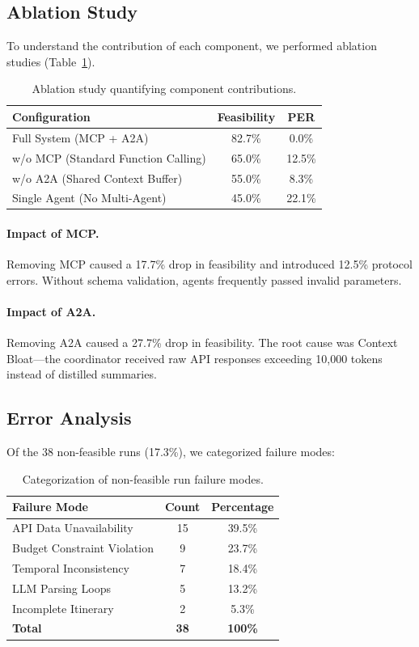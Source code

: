 \documentclass[preprint,review,12pt]{elsarticle}
\begin{document}
\subsection{Ablation Study}

To understand the contribution of each component, we performed ablation studies (Table~\ref{tab:ablation}).

\begin{table}[h]
\centering
\caption{Ablation study quantifying component contributions.}
\label{tab:ablation}
\begin{tabular}{lcc}
\toprule
\textbf{Configuration} & \textbf{Feasibility} & \textbf{PER} \\
\midrule
Full System (MCP + A2A) & 82.7\% & 0.0\% \\
w/o MCP (Standard Function Calling) & 65.0\% & 12.5\% \\
w/o A2A (Shared Context Buffer) & 55.0\% & 8.3\% \\
Single Agent (No Multi-Agent) & 45.0\% & 22.1\% \\
\bottomrule
\end{tabular}
\end{table}

\paragraph{Impact of MCP.} Removing MCP caused a 17.7\% drop in feasibility and introduced 12.5\% protocol errors. Without schema validation, agents frequently passed invalid parameters.

\paragraph{Impact of A2A.} Removing A2A caused a 27.7\% drop in feasibility. The root cause was Context Bloat---the coordinator received raw API responses exceeding 10,000 tokens instead of distilled summaries.

\subsection{Error Analysis}

Of the 38 non-feasible runs (17.3\%), we categorized failure modes:

\begin{table}[h]
\centering
\caption{Categorization of non-feasible run failure modes.}
\label{tab:error_analysis}
\begin{tabular}{lcc}
\toprule
\textbf{Failure Mode} & \textbf{Count} & \textbf{Percentage} \\
\midrule
API Data Unavailability & 15 & 39.5\% \\
Budget Constraint Violation & 9 & 23.7\% \\
Temporal Inconsistency & 7 & 18.4\% \\
LLM Parsing Loops & 5 & 13.2\% \\
Incomplete Itinerary & 2 & 5.3\% \\
\midrule
\textbf{Total} & \textbf{38} & \textbf{100\%} \\
\bottomrule
\end{tabular}
\end{table}
\end{document}
